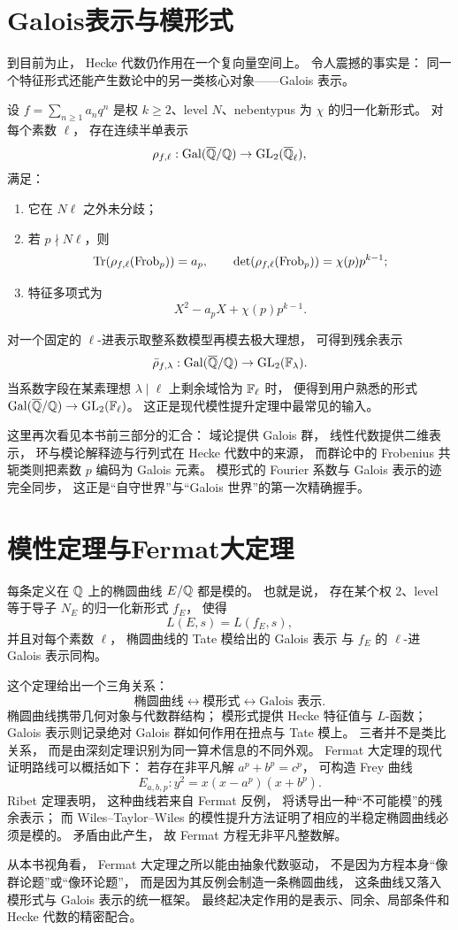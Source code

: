 \section{Galois表示与模形式}
到目前为止， Hecke 代数仍作用在一个复向量空间上。 令人震撼的事实是： 同一个特征形式还能产生数论中的另一类核心对象——Galois 表示。
\begin{theorem}[Deligne，叙述]
设
$f=\sum_{n\ge 1}a_nq^n$
是权 $k\ge 2$、level $N$、nebentypus 为 $\chi$ 的归一化新形式。
对每个素数 $\ell$，
存在连续半单表示
\[ \rho_{f,\ell}:\mathrm{Gal}(\overline{\mathbb{Q}}/\mathbb{Q})\to \mathrm{GL}_2(\overline{\mathbb{Q}}_\ell), \]
满足：
\begin{enumerate}[label=(\roman*), leftmargin=*]
\item 它在 $N\ell$ 之外未分歧；
\item 若 $p\nmid N\ell$，则
\[ \mathrm{Tr}(\rho_{f,\ell}(\mathrm{Frob}_p))=a_p, \qquad \det(\rho_{f,\ell}(\mathrm{Frob}_p))=\chi(p)p^{k-1}; \]
\item 特征多项式为
\[ X^2-a_pX+\chi(p)p^{k-1}. \]
\end{enumerate}
\end{theorem}
对一个固定的 $\ell$-进表示取整系数模型再模去极大理想，
可得到残余表示
\[ \bar\rho_{f,\lambda}:\mathrm{Gal}(\overline{\mathbb{Q}}/\mathbb{Q})\to \mathrm{GL}_2(\mathbb{F}_\lambda). \]
当系数字段在某素理想 $\lambda\mid \ell$ 上剩余域恰为 $\mathbb{F}_\ell$ 时，
便得到用户熟悉的形式
$\mathrm{Gal}(\overline{\mathbb{Q}}/\mathbb{Q})\to \mathrm{GL}_2(\mathbb{F}_\ell)$。
这正是现代模性提升定理中最常见的输入。
\begin{remark}
这里再次看见本书前三部分的汇合：
域论提供 Galois 群，
线性代数提供二维表示，
环与模论解释迹与行列式在 Hecke 代数中的来源，
而群论中的 Frobenius 共轭类则把素数 $p$ 编码为 Galois 元素。
模形式的 Fourier 系数与 Galois 表示的迹完全同步，
这正是“自守世界”与“Galois 世界”的第一次精确握手。
\end{remark}
\section{模性定理与Fermat大定理}
\begin{theorem}[模性定理，叙述]
每条定义在 $\mathbb{Q}$ 上的椭圆曲线 $E/\mathbb{Q}$ 都是模的。
也就是说，
存在某个权 $2$、level 等于导子 $N_E$ 的归一化新形式 $f_E$，
使得
\[ L(E,s)=L(f_E,s), \]
并且对每个素数 $\ell$，
椭圆曲线的 Tate 模给出的 Galois 表示
与 $f_E$ 的 $\ell$-进 Galois 表示同构。
\end{theorem}
这个定理给出一个三角关系：
\[ \text{椭圆曲线} \longleftrightarrow \text{模形式} \longleftrightarrow \text{Galois 表示}. \]
椭圆曲线携带几何对象与代数群结构；
模形式提供 Hecke 特征值与 $L$-函数；
Galois 表示则记录绝对 Galois 群如何作用在扭点与 Tate 模上。
三者并不是类比关系，
而是由深刻定理识别为同一算术信息的不同外观。
Fermat 大定理的现代证明路线可以概括如下：
若存在非平凡解
$a^p+b^p=c^p$，
可构造 Frey 曲线
\[ E_{a,b,p}: y^2=x(x-a^p)(x+b^p). \]
Ribet 定理表明，
这种曲线若来自 Fermat 反例，
将诱导出一种“不可能模”的残余表示；
而 Wiles--Taylor--Wiles 的模性提升方法证明了相应的半稳定椭圆曲线必须是模的。
矛盾由此产生，
故 Fermat 方程无非平凡整数解。
\begin{remark}
从本书视角看，
Fermat 大定理之所以能由抽象代数驱动，
不是因为方程本身“像群论题”或“像环论题”，
而是因为其反例会制造一条椭圆曲线，
这条曲线又落入模形式与 Galois 表示的统一框架。
最终起决定作用的是表示、同余、局部条件和 Hecke 代数的精密配合。
\end{remark}
